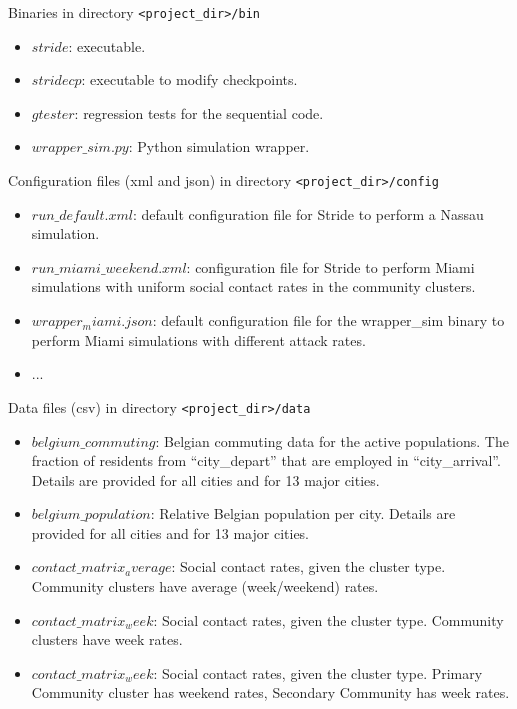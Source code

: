\begin{compactitem}
    \item Binaries 
    		in directory \texttt{<project\_dir>/bin}
      	\begin{itemize}
        		\item $stride$: executable.
            \item $stridecp$: executable to modify checkpoints.
		\item $gtester$: regression tests for the sequential code.
        		\item $wrapper\_sim.py$: Python simulation wrapper. 		
        \end{itemize}
    \item Configuration files (xml and json)
      	in directory \texttt{<project\_dir>/config}
      	\begin{itemize}
		\item $run\_default.xml$: default configuration file for Stride to perform a Nassau simulation.
        		\item $run\_miami\_weekend.xml$: configuration file for Stride to perform Miami simulations with uniform social contact rates in the community clusters.
		\item $wrapper_miami.json$: default configuration file for the wrapper\_sim binary to perform Miami simulations with different attack rates.
		\item ...
        \end{itemize}
    \item Data files (csv)
      	in directory \texttt{<project\_dir>/data}
      	\begin{itemize}
        		\item $belgium\_commuting$: Belgian commuting data for the active populations. The fraction of residents from ``city\_depart'' that are employed in ``city\_arrival''. Details are provided for all cities and for 13 major cities.
		\item $belgium\_population$: Relative Belgian population per city. Details are provided for all cities and for 13 major cities.
		\item $contact\_matrix_average$: Social contact rates, given the cluster type. Community clusters have average (week/weekend) rates.
		\item $contact\_matrix_week$: Social contact rates, given the cluster type. Community clusters have week rates.
		\item $contact\_matrix_week$: Social contact rates, given the cluster type. Primary Community cluster has weekend rates, Secondary Community has week rates.

\end{itemize}
\end{compactitem}
